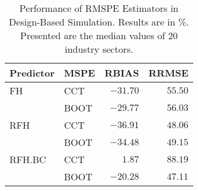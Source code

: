 \begin{table}[ht]
\begin{center}
\begin{tabular}{llrr}
\hline\hline
\multicolumn{1}{c}{Predictor}&\multicolumn{1}{c}{MSPE}&\multicolumn{1}{c}{RBIAS}&\multicolumn{1}{c}{RRMSE}\tabularnewline
\hline
FH&CCT&$-31.70$&$55.50$\tabularnewline
&BOOT&$-29.77$&$56.03$\tabularnewline
RFH&CCT&$-36.91$&$48.06$\tabularnewline
&BOOT&$-34.48$&$49.15$\tabularnewline
RFH.BC&CCT&$  1.87$&$88.19$\tabularnewline
&BOOT&$-20.28$&$47.11$\tabularnewline
\hline
\end{tabular}

\caption[Performance of RMSPE Estimators in Design\hyp{}Based Simulation]{\label{tab:mse_performace_design}Performance of RMSPE Estimators in Design\hyp{}Based Simulation. Results are in \%. Presented are the median values of 20 industry sectors.\label{x}}\end{center}

\end{table}
